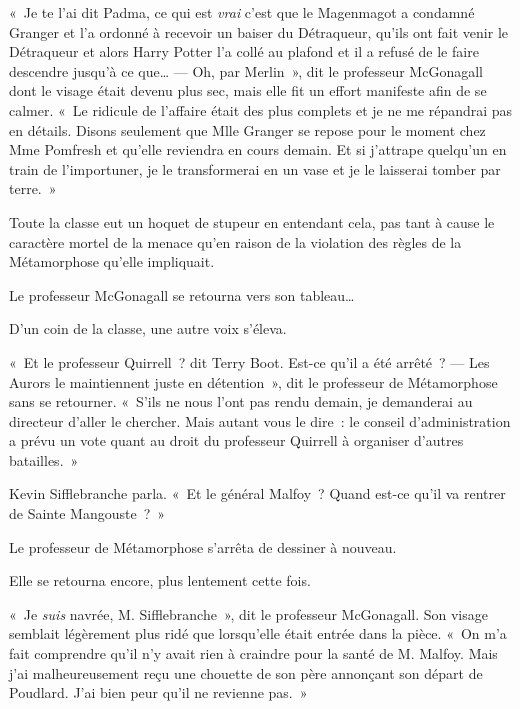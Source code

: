 «~Je te l'ai dit Padma, ce qui est \emph{vrai} c'est que le Magenmagot a condamné Granger et l'a ordonné à recevoir un baiser du Détraqueur, qu'ils ont fait venir le Détraqueur et alors Harry Potter l'a collé au plafond et il a refusé de le faire descendre jusqu'à ce que…
---  Oh, par Merlin~», dit le professeur McGonagall dont le visage était devenu plus sec, mais elle fit un effort manifeste afin de se calmer.
«~Le ridicule de l'affaire était des plus complets et je ne me répandrai pas en détails.
Disons seulement que Mlle Granger se repose pour le moment chez Mme Pomfresh et qu'elle reviendra en cours demain.
Et si j'attrape quelqu'un en train de l'importuner, je le transformerai en un vase et je le laisserai tomber par terre.~»

Toute la classe eut un hoquet de stupeur en entendant cela, pas tant à cause le caractère mortel de la menace qu'en raison de la violation des règles de la Métamorphose qu'elle impliquait.

Le professeur McGonagall se retourna vers son tableau…

D'un coin de la classe, une autre voix s'éleva.

«~Et le professeur Quirrell~? dit Terry Boot.
Est-ce qu'il a été arrêté~?
---  Les Aurors le maintiennent juste en détention~», dit le professeur de Métamorphose sans se retourner.
«~S'ils ne nous l'ont pas rendu demain, je demanderai au directeur d'aller le chercher.
Mais autant vous le dire~: le conseil d'administration a prévu un vote quant au droit du professeur Quirrell à organiser d'autres batailles.~»

Kevin Sifflebranche parla.
«~Et le général Malfoy~?
Quand est-ce qu'il va rentrer de Sainte Mangouste~?~»

Le professeur de Métamorphose s'arrêta de dessiner à nouveau.

Elle se retourna encore, plus lentement cette fois.

«~Je \emph{suis} navrée, M. Sifflebranche~», dit le professeur McGonagall.
Son visage semblait légèrement plus ridé que lorsqu'elle était entrée dans la pièce.
«~On m'a fait comprendre qu'il n'y avait rien à craindre pour la santé de M. Malfoy.
Mais j'ai malheureusement reçu une chouette de son père annonçant son départ de Poudlard.
J'ai bien peur qu'il ne revienne pas.~»
